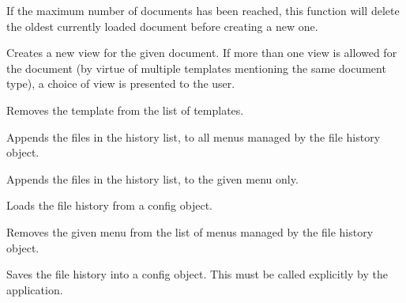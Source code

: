 If the maximum number of documents has been reached, this function
will delete the oldest currently loaded document before creating a new one.


\label{wxdocmanagercreateview}


Creates a new view for the given document. If more than one view is allowed for the
document (by virtue of multiple templates mentioning the same document type), a choice
of view is presented to the user.


\label{wxdocmanagerdisassociatetemplate}


Removes the template from the list of templates.


\label{wxdocmanagerfilehistoryaddfilestomenu}


Appends the files in the history list, to all menus managed by the file history object.


Appends the files in the history list, to the given menu only.


\label{wxdocmanagerfilehistoryload}


Loads the file history from a config object.




\label{wxdocmanagerfilehistoryremovemenu}


Removes the given menu from the list of menus managed by the file history object.


\label{wxdocmanagerfilehistorysave}


Saves the file history into a config object. This must be called
explicitly by the application.

